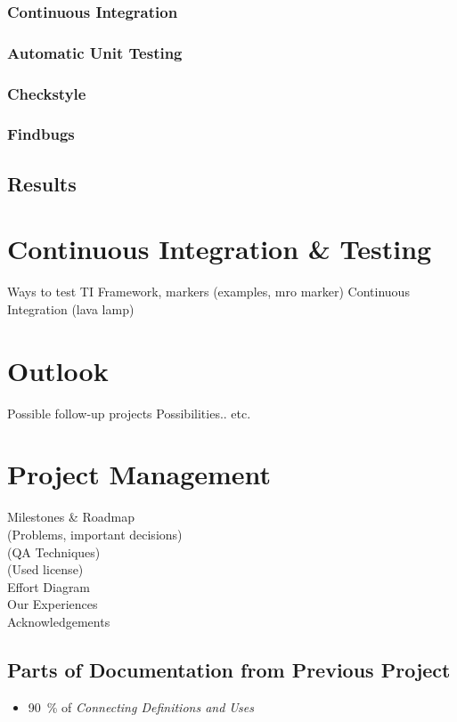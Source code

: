 \documentclass[12pt,halfparskip]{scrreprt}
\begin{document}
\subsection{Continuous Integration}
\subsection{Automatic Unit Testing}
\subsection{Checkstyle}
\subsection{Findbugs}
\section{Results}

\chapter{Continuous Integration \& Testing}
 Ways to test TI
 Framework, markers
  (examples, mro marker)
 Continuous Integration
  (lava lamp)

\chapter{Outlook}
 Possible follow-up projects
 Possibilities.. etc.

\chapter{Project Management}
 Milestones \& Roadmap \\
 (Problems, important decisions) \\
 (QA Techniques) \\
 (Used license) \\
 Effort Diagram \\
 Our Experiences \\
 Acknowledgements 

\section{Parts of Documentation from Previous Project}

\begin{itemize}
	\item 90~\% of \emph{Connecting Definitions and Uses} %
\end{itemize}
\end{document}

